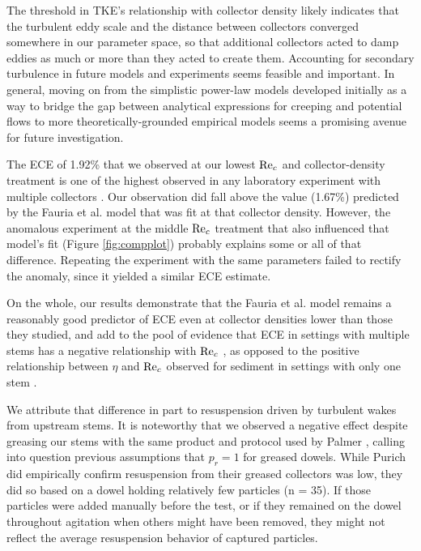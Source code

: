 \documentclass[geosciences,article,submit,moreauthors,pdftex]{Definitions/mdpi}
\begin{document}
The threshold in TKE's relationship with collector density likely indicates that the turbulent eddy scale and the distance between collectors converged somewhere in our parameter space, so that additional collectors acted to damp eddies as much or more than they acted to create them. Accounting for secondary turbulence in future models and experiments seems feasible and important. In general, moving on from the simplistic power-law models developed initially as a way to bridge the gap between analytical expressions for creeping and potential flows to more theoretically-grounded empirical models \cite{stein2020} seems a promising avenue for future investigation.

The ECE of 1.92\% that we observed at our lowest $\mathrm{Re}_c$ and collector-density treatment is one of the highest observed in any laboratory experiment with multiple collectors \cite{stein2020}. Our observation did fall above the value (1.67\%) predicted by the Fauria et al. model \cite{Fauria_2015} that was fit at that collector density. However, the anomalous experiment at the middle $\mathrm{Re}_c$ treatment that also influenced that model's fit (Figure \ref{fig:compplot}) probably explains some or all of that difference. Repeating the experiment with the same parameters failed to rectify the anomaly, since it yielded a similar ECE estimate.

On the whole, our results demonstrate that the Fauria et al. model remains a reasonably good predictor of ECE even at collector densities lower than those they studied, and add to the pool of evidence that ECE in settings with multiple stems has a negative relationship with $\mathrm{Re}_c$ \cite{Fauria_2015,wu2014colloid}, as opposed to the positive relationship between $\eta$ and $\mathrm{Re}_c$ observed for sediment in settings with only one stem \cite{Palmer_2004}. 

We attribute that difference in part to resuspension driven by turbulent wakes from upstream stems. It is noteworthy that we observed a negative effect despite greasing our stems with the same product and protocol used by Palmer \cite{Palmer_2004}, calling into question previous assumptions that $p_r = 1$ for greased dowels. While Purich \cite{purich2006capture} did empirically confirm resuspension from their greased collectors was low, they did so based on a dowel holding relatively few particles (n = 35). If those particles were added manually before the test, or if they remained on the dowel throughout agitation when others might have been removed, they might not reflect the average resuspension behavior of captured particles.
\end{document}
